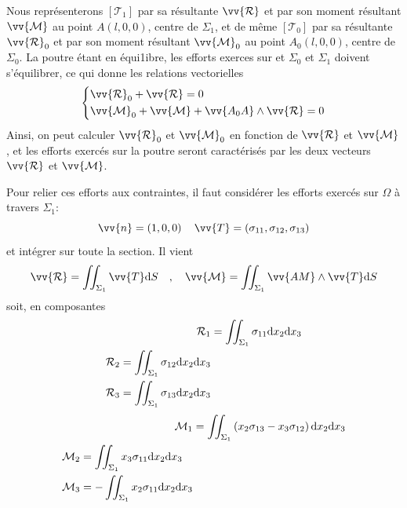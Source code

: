 Nous représenterons $\left[ \mathcal{T}_1 \right]$ par sa résultante $\vv{\mathcal{R}}$ et par son moment résultant $\vv{\mathcal{M}}$ au point $A\left( l,0,0 \right)$, centre de $\Sigma_1$, et de même $\left[ \mathcal{T}_0 \right]$ par sa résultante $\vv{\mathcal{R}}_0$ et par son moment résultant $\vv{\mathcal{M}}_0$ au point $A_0\left( l,0,0 \right)$, centre de $\Sigma_0$.
La poutre étant en équi1ibre, les efforts exerces sur et $\Sigma_0$ et $\Sigma_1$ doivent s'équilibrer, ce qui donne les relations vectorielles
\begin{equation}
    \left\{
    \begin{aligned}
        & \vv{\mathcal{R}}_0 + \vv{\mathcal{R}} = 0 \\
        & \vv{\mathcal{M}}_0 + \vv{\mathcal{M}} + \vv{A_0 A} \wedge  \vv{\mathcal{R}} = 0
    \end{aligned}
    \right.
    \label{eq:Ch07-002}
\end{equation}
Ainsi, on peut calculer $\vv{\mathcal{R}}_0$ et $\vv{\mathcal{M}}_0$ en fonction de $\vv{\mathcal{R}}$ et $\vv{\mathcal{M}}$, et les efforts exercés sur la poutre seront caractérisés par les deux vecteurs $\vv{\mathcal{R}}$ et $\vv{\mathcal{M}}$.

Pour relier ces efforts aux contraintes, il faut considérer les efforts exercés sur $\Omega$ à travers  $\Sigma_1$:
\begin{equation}
    \vv{n} = \left( 1,0,0 \right) \quad \vv{T} = \left( \sigma_{11}, \sigma_{12}, \sigma_{13} \right)
    \label{eq:Ch07-003}
\end{equation}
et intégrer sur toute la section.
Il vient
\begin{equation}
    \vv{\mathcal{R}} = \iint_{\Sigma_1} \vv{T} \ud S \quad,\quad \vv{\mathcal{M}} = \iint_{\Sigma_1} \vv{AM} \wedge \vv{T} \ud S
    \label{eq:Ch07-004}
\end{equation}
soit, en composantes
\begin{align}
    \mathcal{R}_1 &= \iint_{\Sigma_1} \sigma_{11} \mathrm{d} x_2 \mathrm{d} x_3    \label{eq:Ch07-005} \\
    \begin{split}
        \mathcal{R}_2 &= \iint_{\Sigma_1} \sigma_{12} \mathrm{d} x_2 \mathrm{d} x_3 \\
        \mathcal{R}_3 &= \iint_{\Sigma_1} \sigma_{13} \mathrm{d} x_2 \mathrm{d} x_3    \label{eq:Ch07-006}
    \end{split}
\end{align}
\begin{align}
    \mathcal{M}_1 &= \iint_{\Sigma_1} \left( x_2\sigma_{13} - x_3\sigma_{12} \right) \mathrm{d} x_2 \mathrm{d} x_3    \label{eq:Ch07-007} \\
    \begin{split}
        \mathcal{M}_2 &= \iint_{\Sigma_1} x_3\sigma_{11} \mathrm{d} x_2 \mathrm{d} x_3 \\
        \mathcal{M}_3 &= -\iint_{\Sigma_1} x_2\sigma_{11} \mathrm{d} x_2 \mathrm{d} x_3    \label{eq:Ch07-008}
    \end{split}
\end{align}

